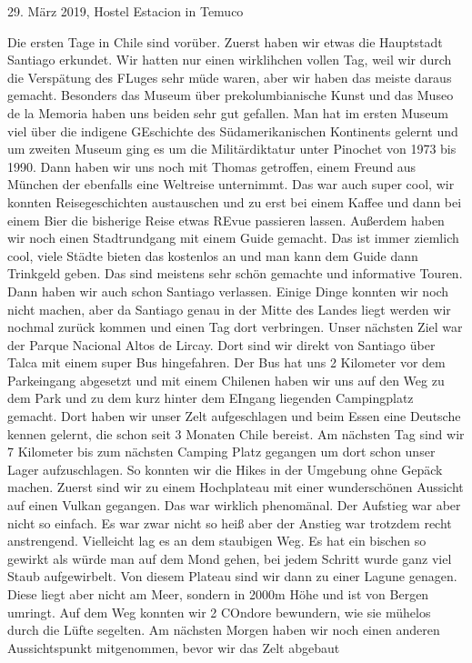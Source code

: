 \documentclass[11pt]{book}
\begin{document}
29. März 2019, Hostel Estacion in Temuco

Die ersten Tage in Chile sind vorüber. Zuerst haben wir etwas die Hauptstadt Santiago erkundet. Wir hatten nur einen wirklihchen 
vollen Tag, weil wir durch die Verspätung des FLuges sehr müde waren, aber wir haben das meiste daraus gemacht. Besonders das Museum 
über prekolumbianische Kunst und das Museo de la Memoria haben uns beiden sehr gut gefallen. Man hat im ersten Museum viel über die 
indigene GEschichte des Südamerikanischen Kontinents gelernt und um zweiten Museum ging es um die Militärdiktatur unter Pinochet 
von 1973 bis 1990. Dann haben wir uns noch mit Thomas getroffen, einem Freund aus München der ebenfalls eine Weltreise unternimmt.
Das war auch super cool, wir konnten Reisegeschichten austauschen und zu erst bei einem Kaffee und dann bei einem Bier die bisherige 
Reise etwas REvue passieren lassen. Außerdem haben wir noch einen Stadtrundgang mit einem Guide gemacht. Das ist immer ziemlich 
cool, viele Städte bieten das kostenlos an und man kann dem Guide dann Trinkgeld geben. Das sind meistens sehr schön gemachte und 
informative Touren. 
Dann haben wir auch schon Santiago verlassen. Einige Dinge konnten wir noch nicht machen, aber da Santiago genau in der Mitte des Landes 
liegt werden wir nochmal zurück kommen und einen Tag dort verbringen. 
Unser nächsten Ziel war der Parque Nacional Altos de Lircay. Dort sind wir direkt von Santiago über Talca mit einem super Bus hingefahren. 
Der Bus hat uns 2 Kilometer vor dem Parkeingang abgesetzt und mit einem Chilenen haben wir uns auf den Weg zu dem Park und zu dem 
kurz hinter dem EIngang liegenden Campingplatz gemacht. Dort haben wir unser Zelt aufgeschlagen und beim Essen eine Deutsche kennen gelernt, 
die schon seit 3 Monaten Chile bereist. Am nächsten Tag sind wir 7 Kilometer bis zum nächsten Camping Platz gegangen um dort schon 
unser Lager aufzuschlagen. So konnten wir die Hikes in der Umgebung ohne Gepäck machen. Zuerst sind wir zu einem Hochplateau mit einer 
wunderschönen Aussicht auf einen Vulkan gegangen. Das war wirklich phenomänal. Der Aufstieg war aber nicht so einfach. Es war zwar nicht 
so heiß aber der Anstieg war trotzdem recht anstrengend. Vielleicht lag es an dem staubigen Weg. Es hat ein bischen so gewirkt als 
würde man auf dem Mond gehen, bei jedem Schritt wurde ganz viel Staub aufgewirbelt. Von diesem Plateau sind wir dann zu einer Lagune genagen. 
Diese liegt aber nicht am Meer, sondern in 2000m Höhe und ist von Bergen umringt. Auf dem Weg konnten wir 2 COndore bewundern, wie 
sie mühelos durch die Lüfte segelten. Am nächsten Morgen haben wir noch einen anderen Aussichtspunkt mitgenommen, bevor wir das Zelt abgebaut 
\end{document}

